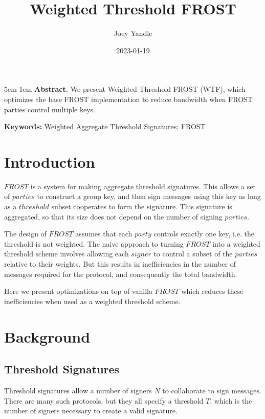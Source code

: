 \documentclass{article}
\title{Weighted Threshold FROST}
\date{2023-01-19}
\author{Joey Yandle}
\begin{document}
\onecolumn
\maketitle

\begingroup
\leftskip5em
\parskip1em
\rightskip\leftskip
\noindent\textbf{Abstract.} We present Weighted Threshold FROST (WTF), which optimizes the base FROST implementation to reduce bandwidth when FROST parties control multiple keys.

\par
\noindent\textbf{Keywords:} Weighted Aggregate Threshold Signatures; FROST
\par
\endgroup

\section{
  Introduction
}

$FROST$ \cite{frost} is a system for making aggregate threshold signatures.  This allows a set of $parties$ to construct a group key, and then sign messages using this key as long as a $threshold$ subset cooperates to form the signature.  This signature is aggregated, so that its size does not depend on the number of signing $parties$.

The design of $FROST$ assumes that each $party$ controls exactly one key, i.e. the threshold is not weighted.  The naive approach to turning $FROST$ into a weighted threshold scheme involves allowing each $signer$ to control a subset of the $parties$ relative to their weights.  But this results in inefficiencies in the number of messages required for the protocol, and consequently the total bandwidth.

Here we present optimizations on top of vanilla $FROST$ which reduces these inefficiencies when used as a weighted threshold scheme.  


\newpage
\onecolumn
\section{
  Background
}

\subsection{
  Threshold Signatures
}

Threshold signatures allow a number of signers $N$ to collaborate to sign messages.  There are many such protocols, but they all specify a threshold $T$, which is the number of signers necessary to create a valid signature.  
\end{document}

